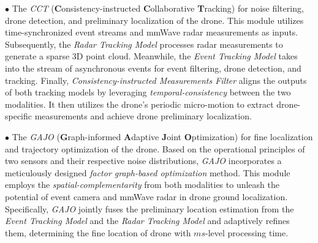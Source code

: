 \noindent $\bullet$ 
The \textit{CCT} (\textbf{C}onsistency-instructed \textbf{C}ollaborative \textbf{T}racking) for noise filtering, drone detection, and preliminary localization of the drone.
This module utilizes time-synchronized event streams and mmWave radar measurements as inputs. 
Subsequently, the \textit{Radar Tracking Model} processes radar measurements to generate a sparse 3D point cloud. 
Meanwhile, the \textit{Event Tracking Model} takes into the stream of asynchronous events for event filtering, drone detection, and tracking. 
Finally, \textit{Consistency-instructed Measurements Filter} aligns the outputs of both tracking models by leveraging \textit{temporal-consistency} between the two modalities. 
It then utilizes the drone's periodic micro-motion to extract drone-specific measurements and achieve drone preliminary localization.

\noindent $\bullet$
The \textit{GAJO} (\textbf{G}raph-informed \textbf{A}daptive \textbf{J}oint \textbf{O}ptimization) for fine localization and trajectory optimization of the drone.
Based on the operational principles of two sensors and their respective noise distributions, \textit{GAJO} incorporates a meticulously designed \textit{factor graph-based optimization} method. 
This module employs the \textit{spatial-complementarity} from both modalities to unleash the potential of event camera and mmWave radar in drone ground localization.
Specifically, \textit{GAJO} jointly fuses the preliminary location estimation from the \textit{Event Tracking Model} and the \textit{Radar Tracking Model} and adaptively refines them, determining the fine location of drone with $ms$-level processing time.
